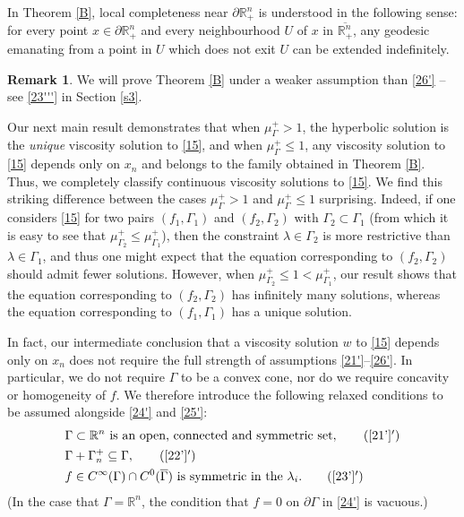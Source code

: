 \documentclass[12pt]{article}
\numberwithin{equation}{section}
\theoremstyle{plain}
\theoremstyle{definition}
\newtheorem{rmk}[thm]{Remark}
\begin{document}
In Theorem \ref{B}, local completeness near $\partial\mathbb{R}_+^n$ is understood in the following sense: for every point $x\in\partial\mathbb{R}_+^n$ and every neighbourhood $U$ of $x$ in $\overline{\mathbb{R}_+^n}$, any geodesic emanating from a point in $U$ which does not exit $U$ can be extended indefinitely. 

\begin{rmk}
	We will prove Theorem \ref{B} under a weaker assumption than \eqref{26'} -- see \eqref{23'''} in Section \ref{s3}. 
\end{rmk}

Our next main result demonstrates that when $\mu_\Gamma^+ > 1$, the hyperbolic solution is the \textit{unique} viscosity solution to \eqref{15}, and when $\mu_\Gamma^+\leq 1$, any viscosity solution to \eqref{15} depends only on $x_n$ and belongs to the family obtained in Theorem \ref{B}. Thus, we completely classify continuous viscosity solutions to \eqref{15}. We find this striking difference between the cases $\mu_\Gamma^+>1$ and $\mu_\Gamma^+ \leq 1$ surprising. Indeed, if one considers \eqref{15} for two pairs $(f_1,\Gamma_1)$ and $(f_2,\Gamma_2)$ with $\Gamma_2 \subset \Gamma_1$ (from which it is easy to see that $\mu_{\Gamma_2}^+ \leq \mu_{\Gamma_1}^+$), then the constraint $\lambda\in\Gamma_2$ is more restrictive than $\lambda\in\Gamma_1$, and thus one might expect that the equation corresponding to $(f_2,\Gamma_2)$ should admit fewer solutions. However, when $\mu_{\Gamma_2}^+ \leq 1 <  \mu_{\Gamma_1}^+$, our result shows that the equation corresponding to $(f_2,\Gamma_2)$ has infinitely many solutions, whereas the equation corresponding to $(f_1,\Gamma_1)$ has a unique solution. \medskip 

 In fact, our intermediate conclusion that a viscosity solution $w$ to \eqref{15} depends only on $x_n$ does not require the full strength of assumptions \eqref{21'}--\eqref{26'}. In particular, we do not require $\Gamma$ to be a convex cone, nor do we require concavity or homogeneity of $f$. We therefore introduce the following relaxed conditions to be assumed alongside \eqref{24'} and \eqref{25'}:
\begin{align}
& \Gamma\subset\mathbb{R}^n\text{ is an open, connected and symmetric set}, \label{21''} \tag{\ref{21'}$'$}\\
& \Gamma + \Gamma_n^+  \subseteq \Gamma,  \label{22''} \tag{\ref{22'}$'$} \\
& f\in C^\infty(\Gamma)\cap C^0(\overline{\Gamma}) \text{ is symmetric in the }\lambda_i. \label{23''} \tag{\ref{23'}$'$}
\end{align}
(In the case that $\Gamma = \mathbb{R}^n$, the condition that $f=0$ on $\partial\Gamma$ in \eqref{24'} is vacuous.)
\end{document}

